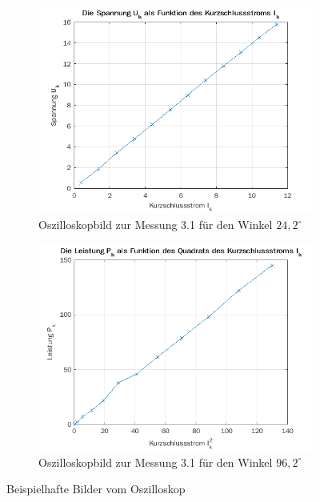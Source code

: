 \documentclass{article}
\begin{document}
\begin{figure}[h]
  \centering
  \begin{subfigure}{.45\textwidth}
    \centering
    \includegraphics[width=\linewidth]{../assets/images/gep3/ik_uk.png}
    \caption{Oszilloskopbild zur Messung 3.1 für den Winkel $24,2^{\circ}$}
  \end{subfigure}
  \begin{subfigure}{.45\textwidth}
    \centering
    \includegraphics[width=\linewidth]{../assets/images/gep3/ik_pk.png}
    \caption{Oszilloskopbild zur Messung 3.1 für den Winkel $96,2^{\circ}$}
  \end{subfigure}
  \label{fig:31_242}
  \caption{Beispielhafte Bilder vom Oszilloskop}
\end{figure}
\end{document}
